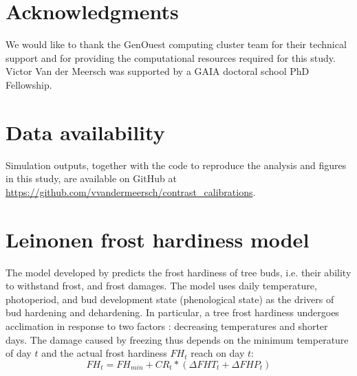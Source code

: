 \documentclass[preprint,12pt,authoryear]{elsarticle}
\begin{document}
{\section*{Acknowledgments}
\noindent We would like to thank the GenOuest computing cluster team for their technical support and for providing the computational resources required for this study. Victor Van der Meersch was supported by a GAIA doctoral school PhD Fellowship.

\section*{Data availability}
\noindent Simulation outputs, together with the code to reproduce the analysis and figures in this study, are available on GitHub at \url{https://github.com/vvandermeersch/contrast_calibrations}.


\clearpage
\appendix


\begin{landscape}

\end{landscape}
\restoregeometry

\newpage

\section{Leinonen frost hardiness model}

The model developed by \cite{Leinonen1996} predicts the frost hardiness of tree buds, i.e. their ability to withstand frost, and frost damages. The model uses daily temperature, photoperiod, and bud development state (phenological state) as the drivers of bud hardening and dehardening. In particular, a tree frost hardiness undergoes acclimation in response to two factors : decreasing temperatures and shorter days. The damage caused by freezing thus depends on the minimum temperature of day $t$ and the actual frost hardiness $FH_t$ reach on day $t$:
\begin{equation}
FH_t = FH_{min} + CR_t * (\Delta FHT_t + \Delta FHP_t)
\end{equation}

}
\end{document}
